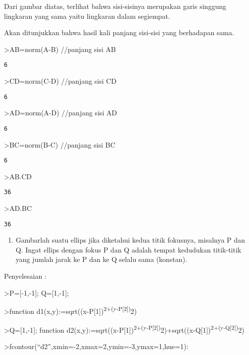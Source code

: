\documentclass[
]{book}
\providecommand{\tightlist}{%
  \setlength{\itemsep}{0pt}\setlength{\parskip}{0pt}}
\begin{document}
Dari gambar diatas, terlihat bahwa sisi-sisinya merupakan garis singgung lingkaran yang sama yaitu lingkaran dalam segiempat.

Akan ditunjukkan bahwa hasil kali panjang sisi-sisi yang berhadapan sama.

\textgreater AB=norm(A-B) //panjang sisi AB

\begin{verbatim}
6
\end{verbatim}

\textgreater CD=norm(C-D) //panjang sisi CD

\begin{verbatim}
6
\end{verbatim}

\textgreater AD=norm(A-D) //panjang sisi AD

\begin{verbatim}
6
\end{verbatim}

\textgreater BC=norm(B-C) //panjang sisi BC

\begin{verbatim}
6
\end{verbatim}

\textgreater AB.CD

\begin{verbatim}
36
\end{verbatim}

\textgreater AD.BC

\begin{verbatim}
36
\end{verbatim}

\begin{enumerate}
\def\labelenumi{\arabic{enumi}.}
\setcounter{enumi}{3}
\tightlist
\item
  Gambarlah suatu ellips jika diketahui kedua titik fokusnya, misalnya P dan Q. Ingat ellips dengan fokus P dan Q adalah tempat kedudukan titik-titik yang jumlah jarak ke P dan ke Q selalu sama (konstan).
\end{enumerate}

Penyelesaian :

\textgreater P={[}-1,-1{]}; Q={[}1,-1{]};

\textgreater function d1(x,y):=sqrt((x-P{[}1{]})\textsuperscript{2+(y-P{[}2{]})}2)

\textgreater Q={[}1,-1{]}; function d2(x,y):=sqrt((x-P{[}1{]})\textsuperscript{2+(y-P{[}2{]})}2)+sqrt((x-Q{[}1{]})\textsuperscript{2+(y-Q{[}2{]})}2)

\textgreater fcontour(``d2'',xmin=-2,xmax=2,ymin=-3,ymax=1,hue=1):
\end{document}
